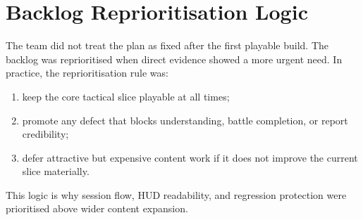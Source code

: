 \section{Backlog Reprioritisation Logic}

The team did not treat the plan as fixed after the first playable build. The backlog was reprioritised when direct evidence showed a more urgent need. In practice, the reprioritisation rule was:

\begin{enumerate}
    \item keep the core tactical slice playable at all times;
    \item promote any defect that blocks understanding, battle completion, or report credibility;
    \item defer attractive but expensive content work if it does not improve the current slice materially.
\end{enumerate}

This logic is why session flow, HUD readability, and regression protection were prioritised above wider content expansion.
